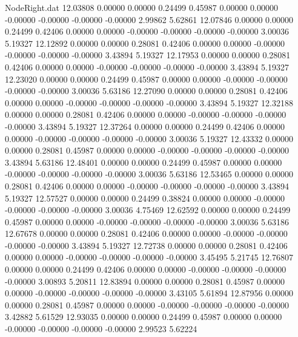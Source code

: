 \begin{filecontents}{NodeRight.dat}
  12.03808    0.00000    0.00000     0.24499    0.45987    0.00000    0.00000   -0.00000   -0.00000   -0.00000   -0.00000    2.99862    5.62861
  12.07846    0.00000    0.00000     0.24499    0.42406    0.00000    0.00000   -0.00000   -0.00000   -0.00000   -0.00000    3.00036    5.19327
  12.12892    0.00000    0.00000     0.28081    0.42406    0.00000    0.00000   -0.00000   -0.00000   -0.00000   -0.00000    3.43894    5.19327
  12.17953    0.00000    0.00000     0.28081    0.42406    0.00000    0.00000   -0.00000   -0.00000   -0.00000   -0.00000    3.43894    5.19327
  12.23020    0.00000    0.00000     0.24499    0.45987    0.00000    0.00000   -0.00000   -0.00000   -0.00000   -0.00000    3.00036    5.63186
  12.27090    0.00000    0.00000     0.28081    0.42406    0.00000    0.00000   -0.00000   -0.00000   -0.00000   -0.00000    3.43894    5.19327
  12.32188    0.00000    0.00000     0.28081    0.42406    0.00000    0.00000   -0.00000   -0.00000   -0.00000   -0.00000    3.43894    5.19327
  12.37264    0.00000    0.00000     0.24499    0.42406    0.00000    0.00000   -0.00000   -0.00000   -0.00000   -0.00000    3.00036    5.19327
  12.43332    0.00000    0.00000     0.28081    0.45987    0.00000    0.00000   -0.00000   -0.00000   -0.00000   -0.00000    3.43894    5.63186
  12.48401    0.00000    0.00000     0.24499    0.45987    0.00000    0.00000   -0.00000   -0.00000   -0.00000   -0.00000    3.00036    5.63186
  12.53465    0.00000    0.00000     0.28081    0.42406    0.00000    0.00000   -0.00000   -0.00000   -0.00000   -0.00000    3.43894    5.19327
  12.57527    0.00000    0.00000     0.24499    0.38824    0.00000    0.00000   -0.00000   -0.00000   -0.00000   -0.00000    3.00036    4.75469
  12.62592    0.00000    0.00000     0.24499    0.45987    0.00000    0.00000   -0.00000   -0.00000   -0.00000   -0.00000    3.00036    5.63186
  12.67678    0.00000    0.00000     0.28081    0.42406    0.00000    0.00000   -0.00000   -0.00000   -0.00000   -0.00000    3.43894    5.19327
  12.72738    0.00000    0.00000     0.28081    0.42406    0.00000    0.00000   -0.00000   -0.00000   -0.00000   -0.00000    3.45495    5.21745
  12.76807    0.00000    0.00000     0.24499    0.42406    0.00000    0.00000   -0.00000   -0.00000   -0.00000   -0.00000    3.00893    5.20811
  12.83894    0.00000    0.00000     0.28081    0.45987    0.00000    0.00000   -0.00000   -0.00000   -0.00000   -0.00000    3.43105    5.61894
  12.87956    0.00000    0.00000     0.28081    0.45987    0.00000    0.00000   -0.00000   -0.00000   -0.00000   -0.00000    3.42882    5.61529
  12.93035    0.00000    0.00000     0.24499    0.45987    0.00000    0.00000   -0.00000   -0.00000   -0.00000   -0.00000    2.99523    5.62224

\end{filecontents}
